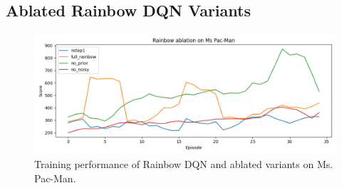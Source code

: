 \documentclass{article}
\begin{document}
\subsection{Ablated Rainbow DQN Variants}
\begin{figure}[H]
  \centering
  \includegraphics[width=\linewidth]{rainbow_ablation_smooth.png}
  \caption{Training performance of Rainbow DQN and ablated variants on Ms. Pac-Man.}
  \label{fig:rainbow_ablation}
\end{figure}

\clearpage
{}


\end{document}
